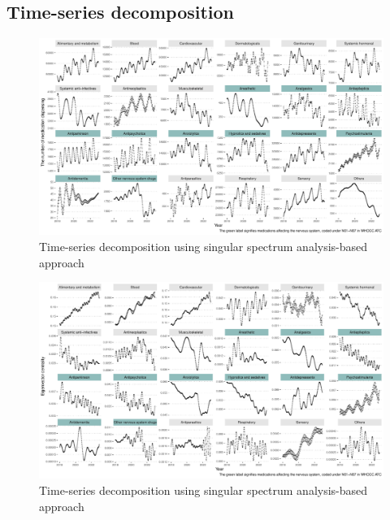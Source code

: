 \documentclass[
  letterpaper,
  DIV=11,
  numbers=noendperiod]{scrartcl}
\begin{document}
\normalpapersize

\subsection{Time-series decomposition}\label{time-series-decomposition}

\begin{figure}[H]

{\centering \includegraphics[width=1\linewidth,height=\textheight,keepaspectratio]{supplementary_files/figure-pdf/unnamed-chunk-2-1.pdf}

}

\caption{Time-series decomposition using singular spectrum
analysis-based approach}

\end{figure}%

\begin{figure}[H]

{\centering \includegraphics[width=1\linewidth,height=\textheight,keepaspectratio]{supplementary_files/figure-pdf/unnamed-chunk-2-2.pdf}

}

\caption{Time-series decomposition using singular spectrum
analysis-based approach}

\end{figure}%
\end{document}
